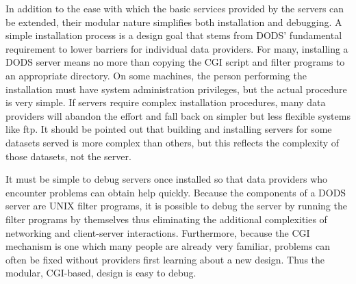 \documentclass[12pt]{article}
\begin{document}
In addition to the ease with which the basic services provided
by the servers can be extended, their modular nature simplifies both installation and
debugging. A simple installation process is a design goal that stems from
\ac{DODS}' fundamental requirement to lower barriers for individual data
providers. For many, installing a \ac{DODS} server means no more than copying
the \ac{CGI} script and filter programs to an appropriate directory. On some
machines, the person performing the installation must have system
administration privileges, but the actual procedure is very simple. If
servers require complex installation procedures, many data providers will abandon the effort
and fall back on simpler but less flexible systems like ftp. It
should be pointed out that building and installing servers for some datasets 
served is more complex than others, but this reflects the complexity of 
those datasets, not the server.

It must be simple to debug servers once installed so that data providers who
encounter problems can obtain help quickly. Because the components of
a \ac{DODS} server are UNIX filter programs, it is possible to debug the
server by running the filter programs by themselves thus eliminating the
additional complexities of networking and client-server interactions.
Furthermore, because the \ac{CGI} mechanism is one which many people are
already very familiar, problems can often be fixed without providers first
learning about a new design. Thus the modular, \ac{CGI}-based, design is easy
to debug.
\end{document}
